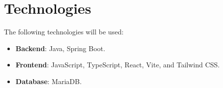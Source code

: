 \documentclass[11pt]{article}
\begin{document}
    \section{Technologies}
    The following technologies will be used:
    \begin{itemize}
        \item \textbf{Backend}: Java, Spring Boot.
    \end{itemize}
    \begin{itemize}
        \item \textbf{Frontend}: JavaScript, TypeScript, React, Vite, and Tailwind CSS.
    \end{itemize}
    \begin{itemize}
        \item \textbf{Database}: MariaDB.
    \end{itemize}
\end{document}
